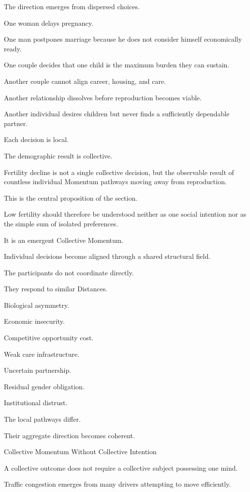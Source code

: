 The direction emerges from dispersed choices.

One woman delays pregnancy.

One man postpones marriage because he does not consider himself economically ready.

One couple decides that one child is the maximum burden they can sustain.

Another couple cannot align career, housing, and care.

Another relationship dissolves before reproduction becomes viable.

Another individual desires children but never finds a sufficiently dependable partner.

Each decision is local.

The demographic result is collective.

Fertility decline is not a single collective decision, but the observable result of countless individual Momentum pathways moving away from reproduction.

This is the central proposition of the section.

Low fertility should therefore be understood neither as one social intention nor as the simple sum of isolated preferences.

It is an emergent Collective Momentum.

Individual decisions become aligned through a shared structural field.

The participants do not coordinate directly.

They respond to similar Distances.

Biological asymmetry.

Economic insecurity.

Competitive opportunity cost.

Weak care infrastructure.

Uncertain partnership.

Residual gender obligation.

Institutional distrust.

The local pathways differ.

Their aggregate direction becomes coherent.

Collective Momentum Without Collective Intention

A collective outcome does not require a collective subject possessing one mind.

Traffic congestion emerges from many drivers attempting to move efficiently.

